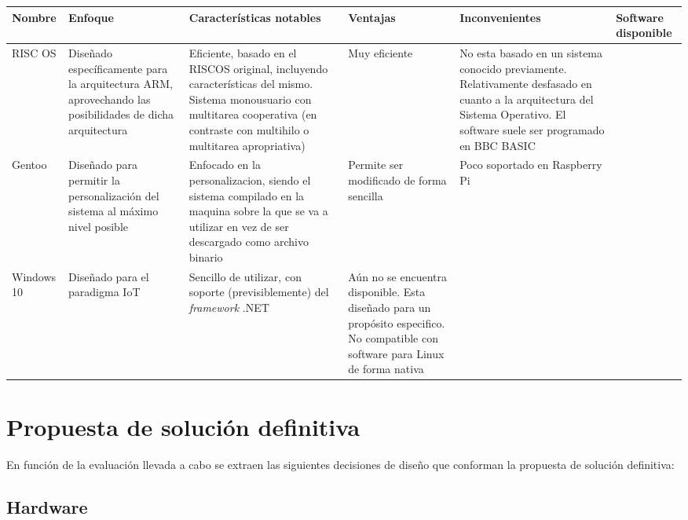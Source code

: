 \begin{landscape}
\begin{table}[h]
\begin{tabular}{|p{2cm}|p{4cm}|p{5cm}|p{3cm}|p{4cm}|p{4cm}|}
\hline
Nombre & Enfoque & Características notables & Ventajas & Inconvenientes & Software disponible\\ \hline

RISC OS & Diseñado específicamente para la arquitectura ARM, aprovechando las posibilidades de dicha arquitectura & Eficiente, basado en el RISCOS original, incluyendo características del mismo. Sistema monousuario con multitarea cooperativa (en contraste con multihilo o multitarea apropriativa) & Muy eficiente & No esta basado en un sistema conocido previamente. Relativamente desfasado en cuanto a la arquitectura del Sistema Operativo. El software suele ser programado en BBC BASIC & \\ \hline

Gentoo & Diseñado para permitir la personalización del sistema al máximo nivel posible & Enfocado en la personalizacion, siendo el sistema compilado en la maquina sobre la que se va a utilizar en vez de ser descargado como archivo binario & Permite ser modificado de forma sencilla & Poco soportado en Raspberry Pi & \\ \hline

Windows 10 & Diseñado para el paradigma IoT & Sencillo de utilizar, con soporte (previsiblemente) del \textit{framework} .NET & Aún no se encuentra disponible\cite{windows10raspberry}. Esta diseñado para un propósito especifico. No compatible con software para Linux de forma nativa & & \\ \hline

\end{tabular}
\end{table}
\end{landscape}


\section{Propuesta de solución definitiva}

En función de la evaluación llevada a cabo se extraen las siguientes decisiones de diseño que conforman la propuesta de solución definitiva:

\subsection{Hardware}

